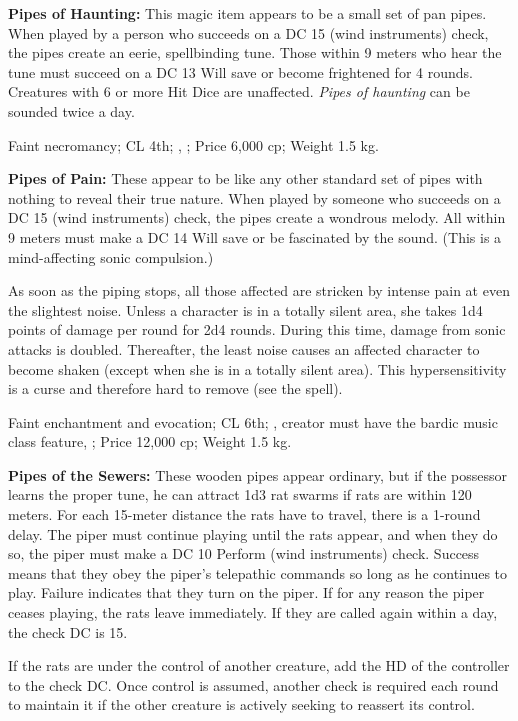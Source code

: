 \textbf{Pipes of Haunting:} This magic item appears to be a small set of pan pipes. When played by a person who succeeds on a DC 15  (wind instruments) check, the pipes create an eerie, spellbinding tune. Those within 9 meters who hear the tune must succeed on a DC 13 Will save or become frightened for 4 rounds. Creatures with 6 or more Hit Dice are unaffected. \emph{Pipes of haunting} can be sounded twice a day.

Faint necromancy; CL 4th; , ; Price 6,000 cp; Weight 1.5 kg.



\textbf{Pipes of Pain:} These appear to be like any other standard set of pipes with nothing to reveal their true nature. When played by someone who succeeds on a DC 15  (wind instruments) check, the pipes create a wondrous melody. All within 9 meters must make a DC 14 Will save or be fascinated by the sound. (This is a mind-affecting sonic compulsion.)

As soon as the piping stops, all those affected are stricken by intense pain at even the slightest noise. Unless a character is in a totally silent area, she takes 1d4 points of damage per round for 2d4 rounds. During this time, damage from sonic attacks is doubled. Thereafter, the least noise causes an affected character to become shaken (except when she is in a totally silent area). This hypersensitivity is a curse and therefore hard to remove (see the  spell).

Faint enchantment and evocation; CL 6th; , creator must have the bardic music class feature, ; Price 12,000 cp; Weight 1.5 kg.



\textbf{Pipes of the Sewers:} These wooden pipes appear ordinary, but if the possessor learns the proper tune, he can attract 1d3 rat swarms if rats are within 120 meters. For each 15-meter distance the rats have to travel, there is a 1-round delay. The piper must continue playing until the rats appear, and when they do so, the piper must make a DC 10 Perform (wind instruments) check. Success means that they obey the piper's telepathic commands so long as he continues to play. Failure indicates that they turn on the piper. If for any reason the piper ceases playing, the rats leave immediately. If they are called again within a day, the  check DC is 15.

If the rats are under the control of another creature, add the HD of the controller to the  check DC. Once control is assumed, another check is required each round to maintain it if the other creature is actively seeking to reassert its control.

